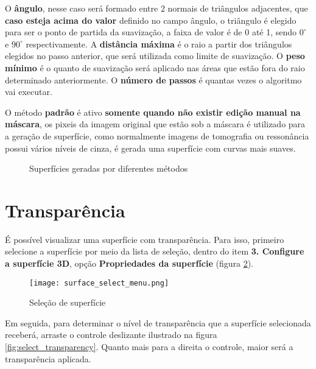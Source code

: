O \textbf{ângulo}, nesse caso será formado entre 2 normais de triângulos adjacentes, que \textbf{caso esteja acima do valor} definido no campo ângulo, o triângulo é elegido para ser o ponto de partida da suavização, a faixa de valor é de 0 até 1, sendo $0^\circ$ e $90^\circ$ respectivamente. A \textbf{distância máxima} é o raio a partir dos triângulos elegidos no passo anterior, que será utilizada como limite de suavização. O \textbf{peso mínimo} é o quanto de suavização será aplicado nas áreas que estão fora do raio determinado anteriormente. O \textbf{número de passos} é quantas vezes o algoritmo vai executar. 

O método \textbf{padrão} é ativo \textbf{somente quando não existir edição manual na máscara}, os pixeis da imagem original que estão sob a máscara é utilizado para a geração de superfície, como normalmente imagens de tomografia ou ressonância possui vários níveis de cinza, é gerada uma superfície com curvas mais suaves.

\begin{figure}[!htb]
  \centering
  \hfill
  \hfill  
  \caption{Superfícies geradas por diferentes métodos }
  \label{fig:surf_method}
\end{figure}



\section{Transparência}

É possível visualizar uma superfície com transparência. Para isso, primeiro selecione a
superfície por meio da lista de seleção, dentro do item \textbf{3. Configure a superfície 3D}, opção
\textbf{Propriedades da superfície} (figura \ref{fig:select_surface}).

\begin{figure}[!htb]
\centering
\texttt{[image: surface\_select\_menu.png]}
\caption{Seleção de superfície}
\label{fig:select_surface}
\end{figure}

Em seguida, para determinar o nível de transparência que a superfície selecionada receberá, arraste
o controle deslizante ilustrado na figura \ref{fig:select_transparency}. Quanto mais para a direita
o controle, maior será a transparência aplicada.


